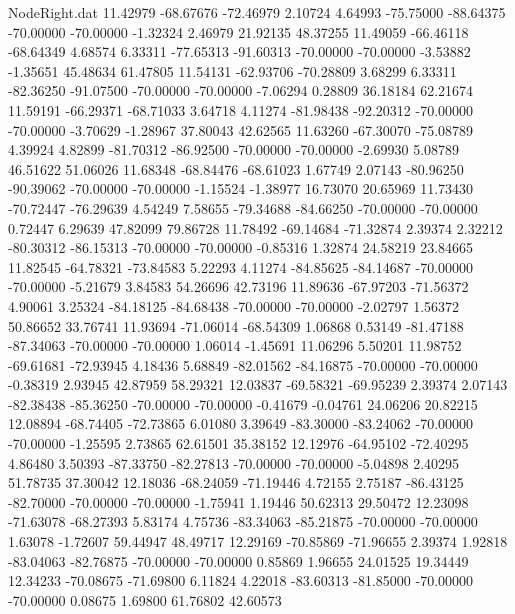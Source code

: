 \begin{filecontents}{NodeRight.dat}
  11.42979  -68.67676  -72.46979     2.10724    4.64993  -75.75000  -88.64375  -70.00000  -70.00000   -1.32324    2.46979   21.92135   48.37255
  11.49059  -66.46118  -68.64349     4.68574    6.33311  -77.65313  -91.60313  -70.00000  -70.00000   -3.53882   -1.35651   45.48634   61.47805
  11.54131  -62.93706  -70.28809     3.68299    6.33311  -82.36250  -91.07500  -70.00000  -70.00000   -7.06294    0.28809   36.18184   62.21674
  11.59191  -66.29371  -68.71033     3.64718    4.11274  -81.98438  -92.20312  -70.00000  -70.00000   -3.70629   -1.28967   37.80043   42.62565
  11.63260  -67.30070  -75.08789     4.39924    4.82899  -81.70312  -86.92500  -70.00000  -70.00000   -2.69930    5.08789   46.51622   51.06026
  11.68348  -68.84476  -68.61023     1.67749    2.07143  -80.96250  -90.39062  -70.00000  -70.00000   -1.15524   -1.38977   16.73070   20.65969
  11.73430  -70.72447  -76.29639     4.54249    7.58655  -79.34688  -84.66250  -70.00000  -70.00000    0.72447    6.29639   47.82099   79.86728
  11.78492  -69.14684  -71.32874     2.39374    2.32212  -80.30312  -86.15313  -70.00000  -70.00000   -0.85316    1.32874   24.58219   23.84665
  11.82545  -64.78321  -73.84583     5.22293    4.11274  -84.85625  -84.14687  -70.00000  -70.00000   -5.21679    3.84583   54.26696   42.73196
  11.89636  -67.97203  -71.56372     4.90061    3.25324  -84.18125  -84.68438  -70.00000  -70.00000   -2.02797    1.56372   50.86652   33.76741
  11.93694  -71.06014  -68.54309     1.06868    0.53149  -81.47188  -87.34063  -70.00000  -70.00000    1.06014   -1.45691   11.06296    5.50201
  11.98752  -69.61681  -72.93945     4.18436    5.68849  -82.01562  -84.16875  -70.00000  -70.00000   -0.38319    2.93945   42.87959   58.29321
  12.03837  -69.58321  -69.95239     2.39374    2.07143  -82.38438  -85.36250  -70.00000  -70.00000   -0.41679   -0.04761   24.06206   20.82215
  12.08894  -68.74405  -72.73865     6.01080    3.39649  -83.30000  -83.24062  -70.00000  -70.00000   -1.25595    2.73865   62.61501   35.38152
  12.12976  -64.95102  -72.40295     4.86480    3.50393  -87.33750  -82.27813  -70.00000  -70.00000   -5.04898    2.40295   51.78735   37.30042
  12.18036  -68.24059  -71.19446     4.72155    2.75187  -86.43125  -82.70000  -70.00000  -70.00000   -1.75941    1.19446   50.62313   29.50472
  12.23098  -71.63078  -68.27393     5.83174    4.75736  -83.34063  -85.21875  -70.00000  -70.00000    1.63078   -1.72607   59.44947   48.49717
  12.29169  -70.85869  -71.96655     2.39374    1.92818  -83.04063  -82.76875  -70.00000  -70.00000    0.85869    1.96655   24.01525   19.34449
  12.34233  -70.08675  -71.69800     6.11824    4.22018  -83.60313  -81.85000  -70.00000  -70.00000    0.08675    1.69800   61.76802   42.60573

\end{filecontents}
